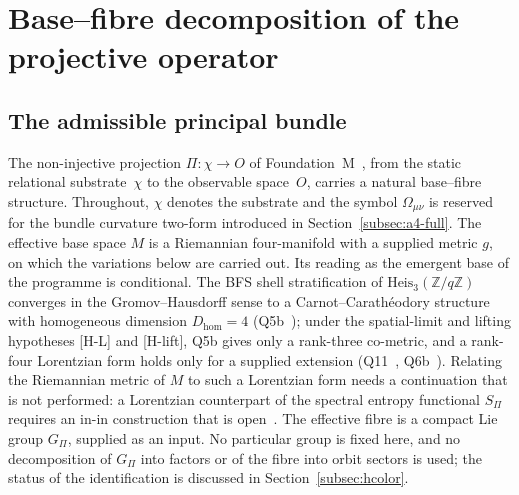 \documentclass[12pt,a4paper]{article}
\theoremstyle{remark}
\theoremstyle{plain}
\theoremstyle{definition}
\begin{document}
      \newpage

  \section{Base--fibre decomposition of the projective operator}
    \label{sec:decomposition}

    \subsection{The admissible principal bundle}
      \label{subsec:bundle}

      The non-injective projection $\Pi : \chi \to O$ of
      Foundation~M~\cite{Beau2026m}, from the static relational
      substrate~$\chi$ to the observable space~$O$, carries a natural
      base--fibre structure.
      Throughout, $\chi$ denotes the substrate and the symbol
      $\Omega_{\mu\nu}$ is reserved for the bundle curvature two-form
      introduced in Section~\ref{subsec:a4-full}.
      The effective base space $M$ is a Riemannian four-manifold with a supplied metric $g$, on which the
      variations below are carried out.
      Its reading as the emergent base of the programme is conditional.
      The BFS shell stratification of $\mathrm{Heis}_3(\mathbb{Z}/q\mathbb{Z})$ converges in the
      Gromov--Hausdorff sense to a Carnot--Carathéodory structure with homogeneous dimension
      $D_{\mathrm{hom}} = 4$ (Q5b~\cite{Beau2026q5b}); under the spatial-limit and lifting hypotheses
      [H-L] and [H-lift], Q5b gives only a rank-three co-metric, and a rank-four Lorentzian form holds only
      for a supplied extension (Q11~\cite{Beau2026q11}, Q6b~\cite{Beau2026q6b}).
      Relating the Riemannian metric of $M$ to such a Lorentzian form needs a continuation that is not performed:
      a Lorentzian counterpart of the spectral entropy functional $S_\Pi$ requires an in-in construction that
      is open~\cite{Beau2026i}.
      The effective fibre is a compact Lie group $G_\Pi$, supplied as an input.
      No particular group is fixed here, and no decomposition of $G_\Pi$ into factors or of
      the fibre into orbit sectors is used; the status of the identification is discussed in
      Section~\ref{subsec:hcolor}.
\end{document}
